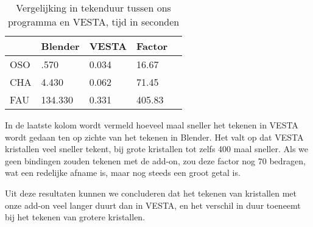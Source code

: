 \begin{table}[H]
\begin{center}
\begin{tabular}{|l|l|l|l|l|}
\hline
			              & Blender    	& VESTA & Factor \\ \hline
\multicolumn{1}{|l|}{OSO} & .570    	& 0.034 & 16.67  \\ \hline
\multicolumn{1}{|l|}{CHA} & 4.430   	& 0.062 & 71.45  \\ \hline
\multicolumn{1}{|l|}{FAU} & 134.330 	& 0.331 & 405.83 \\ \hline
\end{tabular}
\end{center}
\caption{Vergelijking in tekenduur tussen ons programma en VESTA, tijd in seconden}
\end{table}
In de laatste kolom wordt vermeld hoeveel maal sneller het tekenen in VESTA wordt gedaan ten op zichte van het tekenen in Blender. Het valt op dat VESTA kristallen veel sneller tekent, bij grote kristallen tot zelfs 400 maal sneller. Als we geen bindingen zouden tekenen met de add-on, zou deze factor nog 70 bedragen, wat een redelijke afname is, maar nog steeds een groot getal is. 
\par
Uit deze resultaten kunnen we concluderen dat het tekenen van kristallen met onze add-on veel langer duurt dan in VESTA, en het verschil in duur toeneemt bij het tekenen van grotere kristallen.  

